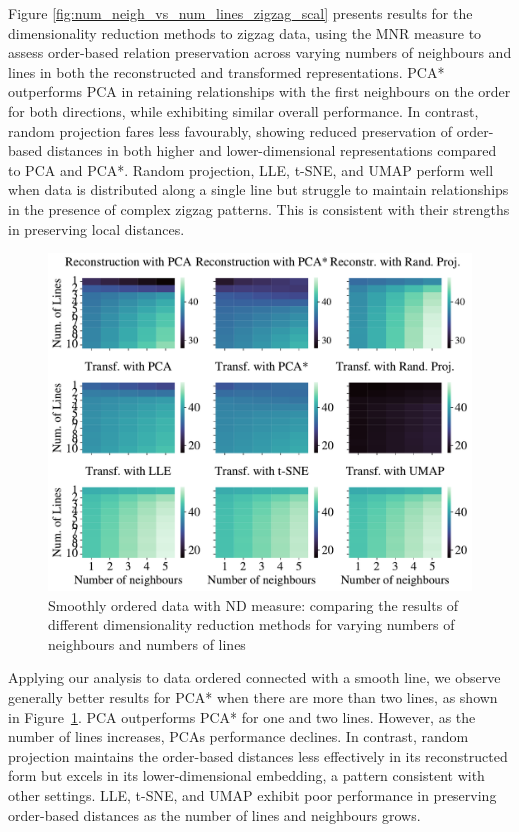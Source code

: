 \documentclass[pdftex,12pt,a4paper]{report}
\begin{document}
Figure \ref{fig:num_neigh_vs_num_lines_zigzag_scal} presents results for the dimensionality reduction methods to zigzag data, using the MNR measure to assess order-based relation preservation across varying numbers of neighbours and lines in both the reconstructed and transformed representations.
PCA* outperforms PCA in retaining relationships with the first neighbours on the order for both directions, while exhibiting similar overall performance.
In contrast, random projection fares less favourably, showing reduced preservation of order-based distances in both higher and lower-dimensional representations compared to PCA and PCA*. 
Random projection, LLE, t-SNE, and UMAP perform well when data is distributed along a single line but struggle to maintain relationships in the presence of complex zigzag patterns.
This is consistent with their strengths in preserving local distances.

\begin{figure}[htb!]
    \includegraphics[width=\textwidth]{./images/multiple_runs/one_line/num_lines_vs_num_neigh/euclidean/all_methods_10runs_10lines_100points_5neighbours.pdf}
    \caption{Smoothly ordered data with ND measure: comparing the results of different dimensionality reduction methods for varying numbers of neighbours and numbers of lines} \label{fig:num_neigh_vs_num_lines_oneline}
\end{figure}

Applying our analysis to data ordered connected with a smooth line, we observe generally better results for PCA* when there are more than two lines, as shown in Figure~\ref{fig:num_neigh_vs_num_lines_oneline}.
PCA outperforms PCA* for one and two lines.
However, as the number of lines increases, PCAs performance declines.
In contrast, random projection maintains the order-based distances less effectively in its reconstructed form but excels in its lower-dimensional embedding, a pattern consistent with other settings.
LLE, t-SNE, and UMAP exhibit poor performance in preserving order-based distances as the number of lines and neighbours grows.
\end{document}
